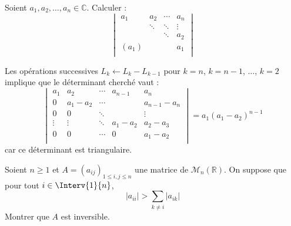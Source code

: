 \documentclass[a4paper,10pt]{report}
\begin{document}
\begin{Exercice}{} Soient $a_1 ,a_2 , \ldots ,a_n \in \mathbb{C}$. Calculer :
    \[
    \begin{vmatrix}
        {a_1} & {a_2} & \cdots & {a_n} \\
        {} & \ddots & \ddots & \vdots \\
        {} & {} & \ddots & {a_2} \\
        {(a_1)} & {} & {} & {a_1} \\
    \end{vmatrix}
    \]
\end{Exercice}

\corr Les opérations successives $L_k \leftarrow L_k - L_{k-1}$ pour $k=n$, $k=n-1$, $\ldots$, $k=2$ implique que le déterminant cherché vaut :
$$  \begin{vmatrix}
        {a_1} & {a_2} & \cdots & a_{n-1} & {a_n} \\
        0 &  a_1-a_2 & \cdots & & a_{n-1}-a_n \\
         0& 0& \ddots & & \vdots\\
        \vdots & \vdots & \ddots& a_1-a_2 & {a_2-a_3} \\
        0 & 0 & \cdots  & 0& {a_1-a_2} \\
    \end{vmatrix} = a_1 (a_1-a_2)^{n-1}$$
 car ce déterminant est triangulaire.
 
 \begin{Exercice}{} Soient $n \geq 1$ et $A = (a_{ij})_{1 \leq i,j \leq n}$ une matrice de $\mathcal{M}_n(\mathbb{R})$. On suppose que pour tout $i \in \Interv{1}{n}$,
$$ \vert a_{ii} \vert > \sum_{k \neq i} \vert a_{ik} \vert $$
Montrer que $A$ est inversible.
\end{Exercice}
\end{document}
